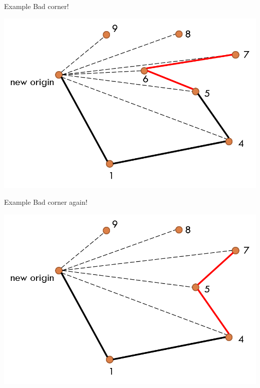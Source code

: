\documentclass[13pt,onlymath]{beamer}
\begin{document}
\begin{frame}{Example}
Bad corner!
\begin{center}
\includegraphics[height=0.5\textheight]{figures/graham9}
\end{center}
\end{frame}

\begin{frame}{Example}
Bad corner again!
\begin{center}
\includegraphics[height=0.5\textheight]{figures/graham10}
\end{center}
\end{frame}
\end{document}
